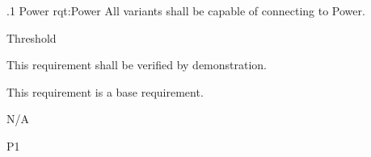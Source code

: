 \ONERQMTVKPP
{\RqtNumberBase.1}
{Power}
{rqt:Power}
{All \ThisSys variants shall be capable of connecting to \TBD Power.}
{
	\item [Phase 1] Threshold
}
{This requirement shall be verified by demonstration.}
{
	\item [N/A] This requirement is a base requirement.
}
{
  \item N/A
}
{P1}


